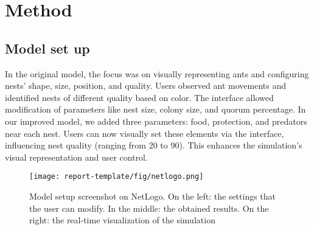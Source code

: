 \documentclass[9pt]{pnas-new}
\begin{document}
\section*{Method}
\subsection*{Model set up}
In the original model, the focus was on visually representing ants and configuring nests' shape, size, position, and quality. Users observed ant movements and identified nests of different quality based on color. The interface allowed modification of parameters like nest size, colony size, and quorum percentage.
In our improved model, we added three parameters: food, protection, and predators near each nest. Users can now visually set these elements via the interface, influencing nest quality (ranging from 20 to 90). This enhances the simulation's visual representation and user control.
\begin{figure}
	\centering
	\texttt{[image: report-template/fig/netlogo.png]}
	\caption{Model setup screenshot on NetLogo. On the left: the settings that the user can modify. In the middle: the obtained results. On the right: the real-time visualization of the simulation}
	\label{fig:netlogo}
\end{figure}
\end{document}
